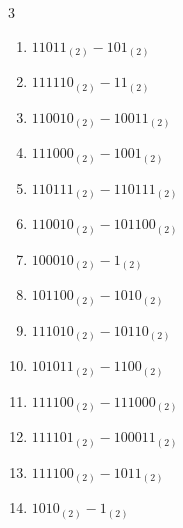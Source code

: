 \begin{multicols}{3}
\begin{enumerate}
  \item $11011_{(2)} - 101_{(2)}$


  \item $111110_{(2)} - 11_{(2)}$


  \item $110010_{(2)} - 10011_{(2)}$


  \item $111000_{(2)} - 1001_{(2)}$


  \item $110111_{(2)} - 110111_{(2)}$


  \item $110010_{(2)} - 101100_{(2)}$


  \item $100010_{(2)} - 1_{(2)}$


\columnbreak %

\resetques

  \item $101100_{(2)} - 1010_{(2)}$


  \item $111010_{(2)} - 10110_{(2)}$


  \item $101011_{(2)} - 1100_{(2)}$


  \item $111100_{(2)} - 111000_{(2)}$


  \item $111101_{(2)} - 100011_{(2)}$


  \item $111100_{(2)} - 1011_{(2)}$


  \item $1010_{(2)} - 1_{(2)}$


\end{enumerate}
\end{multicols}
